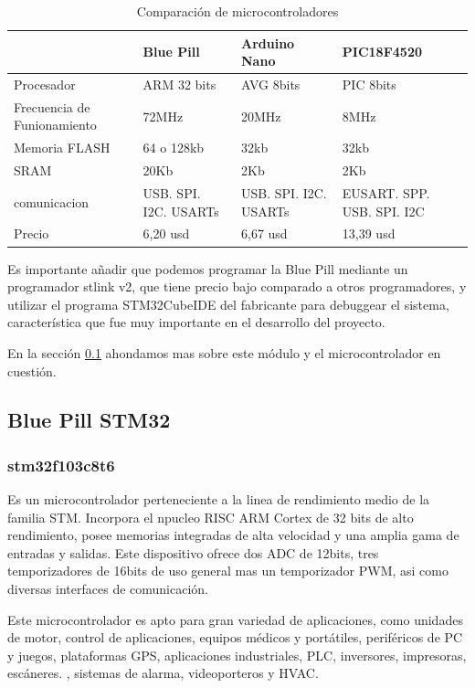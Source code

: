 \begin{table}[t]
    \begin{center}
        \begin{tabular}{ | m{3cm} | m{3cm} | m{3cm} | m{3cm} | }
        \hline  & Blue Pill & Arduino Nano & PIC18F4520  \\ \hline
        Procesador & ARM 32 bits & AVG 8bits & PIC 8bits \\ \hline
        Frecuencia de Funionamiento & 72MHz &20MHz & 8MHz \\ \hline
        Memoria FLASH & 64 o 128kb & 32kb & 32kb\\ \hline
        SRAM & 20Kb & 2Kb & 2Kb \\ \hline
        comunicacion & USB. SPI. I2C. USARTs &  USB. SPI. I2C. USARTs & EUSART. SPP. USB. SPI. I2C\\ \hline
        Precio & 6,20 usd &  6,67 usd & 13,39 usd\\ \hline
        
        \end{tabular}
        \caption{Comparación de microcontroladores}
        \label{tab:uC}   
    \end{center}
\end{table}

Es importante añadir que podemos programar la Blue Pill mediante un programador stlink v2, que tiene precio bajo comparado a otros programadores, y
utilizar el programa STM32CubeIDE del fabricante para debuggear el sistema, característica que fue muy importante en el desarrollo del proyecto.\par
En la sección \ref{cap:stm32} ahondamos mas sobre este módulo y el microcontrolador en cuestión. 

\subsection{Blue Pill STM32} \label{cap:stm32}
\subsubsection{stm32f103c8t6}

Es un microcontrolador perteneciente a la linea de rendimiento medio de la familia STM. Incorpora el npucleo RISC ARM Cortex de 32 bits de alto rendimiento,
posee memorias integradas de alta velocidad y una amplia gama de entradas y salidas. Este dispositivo ofrece dos ADC de 12bits, tres temporizadores de 16bits
de uso general mas un temporizador PWM, asi como diversas interfaces de comunicación.\par 
Este microcontrolador es apto para gran variedad de aplicaciones, como unidades de motor, control de aplicaciones, equipos médicos y portátiles, periféricos
de PC y juegos, plataformas GPS, aplicaciones industriales, PLC, inversores, impresoras, escáneres. , sistemas de alarma, videoporteros y HVAC.

